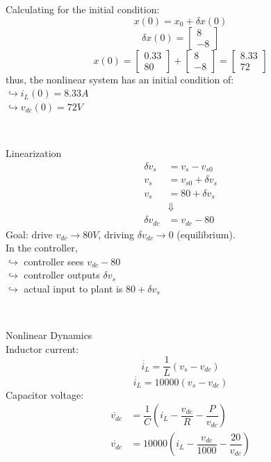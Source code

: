 \documentclass[12pt]{article}
\begin{document}
\begin{tcolorbox}[enhanced, frame hidden, colback=white, borderline west={1pt}{0pt}{gray}]
  Calculating for the initial condition:
  \[x(0) = x_0 + \delta x(0)\]
  \[\delta x(0) = \begin{bmatrix}
    8\\-8
  \end{bmatrix}
  \] 
  \[x(0) = \begin{bmatrix}
    0.33\\80
  \end{bmatrix}+\begin{bmatrix}
    8\\-8
  \end{bmatrix}=\begin{bmatrix}
    8.33\\72
  \end{bmatrix}
  \]
  thus, the nonlinear system has an initial condition of:\\
  $\hookrightarrow i_L(0) = 8.33A$\\
  $\hookrightarrow v_{dc}(0) = 72V$
\end{tcolorbox}

\

\begin{tcolorbox}[enhanced, frame hidden, colback=white, borderline west={1pt}{0pt}{gray}]
  \large{Linearization}\normalsize{}
  \begin{align*}
    \delta v_s &= v_s - v_{s0}\\
    v_s &= v_{s0} + \delta v_s\\
    v_s &= 80 + \delta v_s\\
    &\Downarrow\\
    \delta v_{dc} &= v_{dc} - 80
  \end{align*}
  Goal: drive $v_{dc} \rightarrow 80V$, driving $\delta v_{dc} \rightarrow 0$ (equilibrium).\\

  In the controller, \\
  $\hookrightarrow$ controller sees $v_{dc} - 80$\\
  $\hookrightarrow$ controller outputs $\delta v_s$\\
  $\hookrightarrow$ actual input to plant is $80 + \delta v_s$
\end{tcolorbox}

\

\begin{tcolorbox}[enhanced, frame hidden, colback=white, borderline west={1pt}{0pt}{gray}]
  \large{Nonlinear Dynamics}\normalsize{}\\
  Inductor current:
  \[\dot{i_L} = \dfrac{1}{L}(v_s-v_{dc})\]
  \[\dot{i_L} = 10000(v_s-v_{dc})\] 
  Capacitor voltage:
  \begin{align*}
    \dot{v_{dc}} &= \dfrac{1}{C}(i_L - \dfrac{v_{dc}}{R} - \dfrac{P}{v_{dc}})\\
    \dot{v_{dc}} &= 10000(i_L - \dfrac{v_{dc}}{1000} - \dfrac{20}{v_{dc}})\\
  \end{align*}
\end{tcolorbox}
\end{document}
